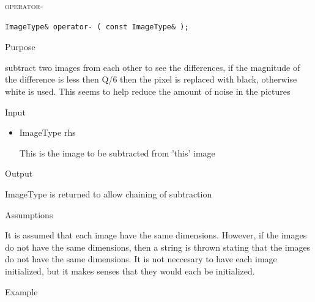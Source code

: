 \documentclass[pdftex, 11pt]{article}
\begin{document}
\begin{description}
\begin{description}
		\end{description}


	\item{\textsc{operator-}}
		\begin{description}

\begin{lstlisting}
ImageType& operator- ( const ImageType& );
\end{lstlisting}

			\item{Purpose}

				subtract two images from each other to see the 
				differences, if the magnitude of
				the difference is less then Q/6 then the pixel
				is replaced with black,	otherwise white is used. 
				This seems to help reduce 
				the amount of noise in the pictures

			\item{Input}

				\begin{itemize}

					\item{ImageType rhs}

						This is the image to be subtracted from
						'this' image

				\end{itemize}

			\item{Output}

				ImageType is returned to allow chaining of subtraction

			\item{Assumptions}

				It is assumed that each image have the same dimensions.
				However, if the images do not have the same dimensions,
				then a string is thrown stating that the images do
				not have the same dimensions. It is not neccesary to have
				each image initialized, but it makes senses
				that they would each be initialized.

			\item{Example}


\end{description}
\end{description}
\end{document}
